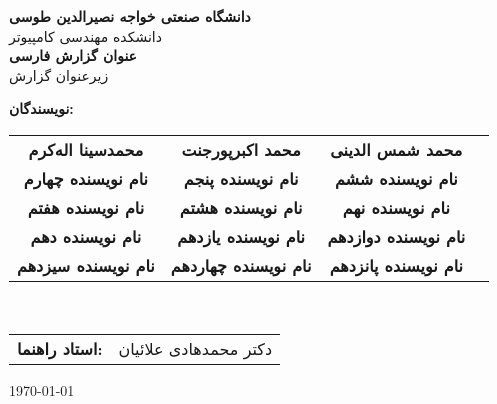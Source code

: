 \begin{titlepage}
    \centering
    
    \vspace*{2cm}
    
    {\Large \textbf{دانشگاه صنعتی خواجه نصیرالدین طوسی}}\\[0.5cm]
    {\large دانشکده مهندسی کامپیوتر}\\[1cm]
    
    {\Huge \textbf{عنوان گزارش فارسی}}\\[0.5cm]
    {\Large زیرعنوان گزارش}\\[1cm]
    
    {\large
        \textbf{نویسندگان:}\\[0.2cm]
        \begin{tabular}{cccc}
            \textbf{محمدسینا اله‌کرم} & \textbf{محمد اکبرپورجنت} & \textbf{محمد شمس الدینی} \\
            \textbf{نام نویسنده چهارم} & \textbf{نام نویسنده پنجم} & \textbf{نام نویسنده ششم} \\
            \textbf{نام نویسنده هفتم} & \textbf{نام نویسنده هشتم} & \textbf{نام نویسنده نهم} \\
            \textbf{نام نویسنده دهم} & \textbf{نام نویسنده یازدهم} & \textbf{نام نویسنده دوازدهم} \\
            \textbf{نام نویسنده سیزدهم} & \textbf{نام نویسنده چهاردهم} & \textbf{نام نویسنده پانزدهم} & \\
            
        \end{tabular}
        \\[1.5cm]
        \begin{tabular}{rl}
            \textbf{استاد راهنما:} & دکتر محمدهادی علائیان \\[0.3cm]
        \end{tabular}
    }
    
    \vfill
    
    {\large \today}
    
\end{titlepage}

\newpage

